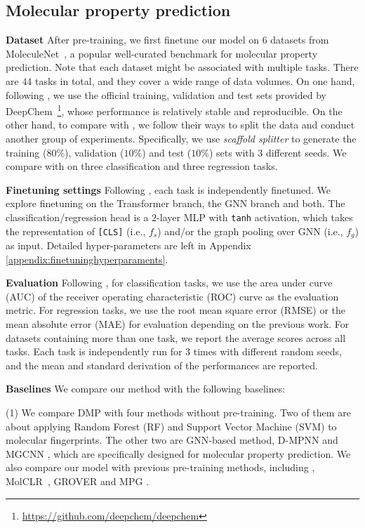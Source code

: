 \documentclass{article}
\newcommand{\ourM}{DMP}
\begin{document}
\subsection{Molecular property prediction}
\noindent\textbf{Dataset} 
After pre-training, we first finetune our model on 6 datasets from MoleculeNet~\cite{wu2018moleculenet}, a popular well-curated benchmark for molecular property prediction. Note that each dataset might be associated with multiple tasks. There are $44$ tasks in total, and they cover a wide range of data volumes. On one hand, following \cite{wang2021molclr}, we use the official training, validation and test sets provided by DeepChem~\footnote{\url{https://github.com/deepchem/deepchem}}, whose performance is relatively stable and reproducible.
On the other hand, to compare with  \citep{rong2020self,li2020learn}, we follow their ways to split the data and conduct another group of experiments. Specifically, we use {\it scaffold splitter} to generate the training ($80\%$), validation ($10\%$) and test ($10\%$) sets with 3 different seeds. We compare with \citep{rong2020self,li2020learn} on three classification and three regression tasks. 


\noindent\textbf{Finetuning settings} Following \cite{liu2019ngram,wang2021molclr}, each task is independently finetuned. We explore finetuning on the Transformer branch, the GNN branch and both. The classification/regression head is a $2$-layer MLP with \texttt{tanh} activation, which takes the representation of \texttt{[CLS]} (i.e., $f_s$) and/or the graph pooling over GNN (i.e., $f_g$) as input. Detailed hyper-parameters are left in Appendix \ref{appendix:finetuninghyperparaments}.

\noindent\textbf{Evaluation}
Following \cite{wu2018moleculenet}, for classification tasks, we use the area under curve (AUC) of the receiver operating characteristic (ROC) curve as the evaluation metric. For regression tasks, we use the root mean square error (RMSE) or the mean absolute error (MAE) for evaluation depending on the previous work. For datasets containing more than one task, we report the average scores across all tasks. Each task is independently run for 3 times with different random seeds, and the mean and standard derivation of the performances are reported. 

\noindent\textbf{Baselines} We compare our method with the following baselines:

\noindent(1) We compare \ourM{} with four methods without pre-training. Two of them are about applying Random Forest (RF) \citep{ho1995random} and Support Vector Machine (SVM) \citep{cortes1995support} to molecular fingerprints. The other two are GNN-based method, D-MPNN \citep{yang2019analyzing} and MGCNN \citep{lu2019molecular}, which are specifically designed for molecular property prediction. We also compare our model with previous pre-training methods, including \citet{hu2019strategies}, MolCLR~\citep{wang2021molclr}, GROVER \citep{rong2020self} and MPG \citep{li2020learn}.
\end{document}
